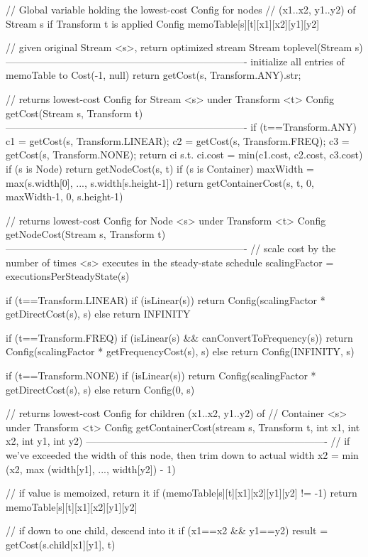 // Global variable holding the lowest-cost Config for nodes
// (x1..x2, y1..y2) of Stream s if Transform t is applied
Config memoTable[s][t][x1][x2][y1][y2]

// given original Stream <s>, return optimized stream
Stream toplevel(Stream s)
-------------------------------------------------------------------------
initialize all entries of memoTable to Cost(-1, null)
return getCost(s, Transform.ANY).str;

// returns lowest-cost Config for Stream <s> under Transform <t>
Config getCost(Stream s, Transform t)
-------------------------------------------------------------------------
if (t==Transform.ANY)
  c1 = getCost(s, Transform.LINEAR);
  c2 = getCost(s, Transform.FREQ);
  c3 = getCost(s, Transform.NONE);
  return ci s.t. ci.cost = min(c1.cost, c2.cost, c3.cost)
if (s is Node)
  return getNodeCost(s, t)
if (s is Container)
  maxWidth = max(s.width[0], ..., s.width[s.height-1])
  return getContainerCost(s, t, 0, maxWidth-1, 0, s.height-1)

// returns lowest-cost Config for Node <s> under Transform <t>
Config getNodeCost(Stream s, Transform t)
-------------------------------------------------------------------------
// scale cost by the number of times <s> executes in the steady-state schedule
scalingFactor = executionsPerSteadyState(s)

if (t==Transform.LINEAR)
  if (isLinear(s))
    return Config(scalingFactor * getDirectCost(s), s)
  else
    return INFINITY

if (t==Transform.FREQ)
  if (isLinear(s) && canConvertToFrequency(s))
    return Config(scalingFactor * getFrequencyCost(s), s)
  else 
    return Config(INFINITY, s)

if (t==Transform.NONE)
  if (isLinear(s))
    return Config(scalingFactor * getDirectCost(s), s)
  else
    return Config(0, s)

// returns lowest-cost Config for children (x1..x2, y1..y2) of
// Container <s> under Transform <t>
Config getContainerCost(stream s, Transform t, int x1, int x2, int y1, int y2)
-------------------------------------------------------------------------
// if we've exceeded the width of this node, then trim down to actual width
x2 = min (x2, max (width[y1], ..., width[y2]) - 1)

// if value is memoized, return it
if (memoTable[s][t][x1][x2][y1][y2] != -1)
  return memoTable[s][t][x1][x2][y1][y2]

// if down to one child, descend into it
if (x1==x2 && y1==y2)
  result = getCost(s.child[x1][y1], t)

